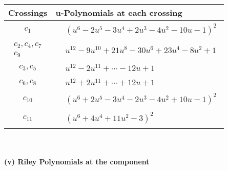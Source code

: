 \documentclass[1p]{elsarticle_modified}
\theoremstyle{definition}
\begin{document}
\begin{tabular}{m{50pt}|m{274pt}}
Crossings & \hspace{64pt}u-Polynomials at each crossing \\
\hline $$\begin{aligned}c_{1}\end{aligned}$$&$\begin{aligned}
&(u^6-2 u^5-3 u^4+2 u^3-4 u^2-10 u-1)^2
\end{aligned}$\\
\hline $$\begin{aligned}c_{2},c_{4},c_{7}\\c_{9}\end{aligned}$$&$\begin{aligned}
&u^{12}-9 u^{10}+21 u^8-30 u^6+23 u^4-8 u^2+1
\end{aligned}$\\
\hline $$\begin{aligned}c_{3},c_{5}\end{aligned}$$&$\begin{aligned}
&u^{12}-2 u^{11}+\cdots-12 u+1
\end{aligned}$\\
\hline $$\begin{aligned}c_{6},c_{8}\end{aligned}$$&$\begin{aligned}
&u^{12}+2 u^{11}+\cdots+12 u+1
\end{aligned}$\\
\hline $$\begin{aligned}c_{10}\end{aligned}$$&$\begin{aligned}
&(u^6+2 u^5-3 u^4-2 u^3-4 u^2+10 u-1)^2
\end{aligned}$\\
\hline $$\begin{aligned}c_{11}\end{aligned}$$&$\begin{aligned}
&(u^6+4 u^4+11 u^2-3)^2
\end{aligned}$\\
\hline
\end{tabular}\\~\\
\newpage\renewcommand{\arraystretch}{1}
\flushleft \textbf{(v) Riley Polynomials at the component}\newline \\
\end{document}

